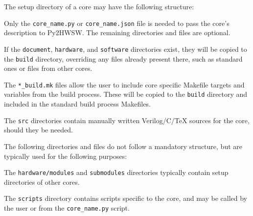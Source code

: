 The setup directory of a core may have the following structure:

%

Only the \texttt{core\_name.py} or \texttt{core\_name.json} file is needed to pass the core's description to Py2HWSW.
The remaining directories and files are optional.

If the \texttt{document}, \texttt{hardware}, and \texttt{software} directories exist, they will be copied to the \texttt{build} directory, overriding any files already present there, such as standard ones or files from other cores.

The \texttt{*\_build.mk} files allow the user to include core specific Makefile targets and variables from the build process.
These will be copied to the \texttt{build} directory and included in the standard build process Makefiles.

The \texttt{src} directories contain manually written Verilog/C/TeX sources for the core, should they be needed.

The following directories and files do not follow a mandatory structure, but are typically used for the following purposes:

The \texttt{hardware/modules} and \texttt{submodules} directories typically contain setup directories of other cores.

The \texttt{scripts} directory contains scripts specific to the core, and may be called by the user or from the \texttt{core\_name.py} script.
